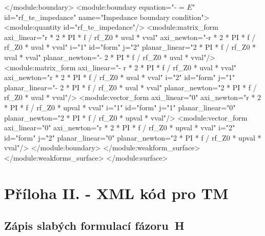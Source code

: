 \documentclass[12pt,a4paper,oneside]{article}
\numberwithin{equation}{section} %
\numberwithin{figure}{section} %
\numberwithin{table}{section} %
\newcommand{\mj}{\mathrm{j}} %
\newcommand{\vecfaz}[1]{\mbox{\underline{\boldmath$#1$}}} %
\begin{document}
\begin{spverbatim}
        </module:boundary>
        <module:boundary equation="-  \frac{\partial \vecfaz{E}}{\partial n_0} = \sqrt{\frac{\varepsilon - \mj \sigma / \omega}{\mu}} \vecfaz{E}" id="rf_te_impedance" name="Impedance boundary condition">
          <module:quantity id="rf_te_impedance"/>
          <module:matrix_form axi_linear="r * 2 * PI * f / rf_Z0 * uval * vval" axi_newton="-r * 2 * PI * f / rf_Z0 * uval * vval" i="1" id="form" j="2" planar_linear="2 * PI * f / rf_Z0 * uval * vval" planar_newton="- 2 * PI * f / rf_Z0 * uval * vval"/>
          <module:matrix_form axi_linear="- r * 2 * PI * f / rf_Z0 * uval * vval" axi_newton="r * 2 * PI * f / rf_Z0 * uval * vval" i="2" id="form" j="1" planar_linear="- 2 * PI * f / rf_Z0 * uval * vval" planar_newton="2 * PI * f / rf_Z0 * uval * vval"/>
          <module:vector_form axi_linear="0" axi_newton="r * 2 * PI * f / rf_Z0 * upval * vval" i="1" id="form" j="1" planar_linear="0" planar_newton="2 * PI * f / rf_Z0 * upval * vval"/>
          <module:vector_form axi_linear="0" axi_newton="r * 2 * PI * f / rf_Z0 * upval * vval" i="2" id="form" j="2" planar_linear="0" planar_newton="2 * PI * f / rf_Z0 * upval * vval"/>
        </module:boundary>
      </module:weakform_surface>
    </module:weakforms_surface>
  </module:surface>
\end{spverbatim}


\newpage
\section*{Příloha II. - XML kód pro TM}
\subsection*{Zápis slabých formulací fázoru~H}
\label{xmlH}
\end{document}
